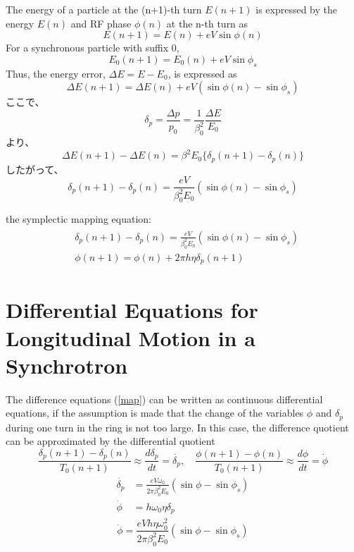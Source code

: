 \documentclass[10pt,a4paper]{ltjsarticle}
\begin{document}
The energy of a particle at the (n+1)-th turn $E(n+1)$ is expressed by the energy $E(n)$ and RF phase $\phi(n)$ at the n-th turn as
%
\begin{equation}
    E(n+1) = E(n) + e V \sin\phi (n)
\end{equation}
%
For a synchronous particle with suffix 0,
%
\begin{equation}
    E_0(n+1) = E_0(n) + e V \sin\phi_s
\end{equation}
%
Thus, the energy error, $\Delta E = E - E_0$, is expressed as
%
\begin{equation}
    \Delta E(n+1) = \Delta E(n) + e V (\sin\phi(n) - \sin\phi_s)
\end{equation}
%
ここで、
%
\begin{equation}
    \delta_p = \frac{\Delta p}{p_0} = \frac{1}{\beta_0^2}\frac{\Delta E}{E_0}
\end{equation}
%
より、
%
\begin{equation}
    \Delta E(n+1) - \Delta E(n) = \beta^2 E_0 \{\delta_p(n+1) - \delta_p(n)\}
\end{equation}
%
したがって、
%
\begin{equation}
    \delta_p(n+1) - \delta_p(n) = \frac{e V}{\beta_0^2 E_0}(\sin\phi(n) -\sin\phi_s)
\end{equation}
%

the symplectic mapping equation:
%
\begin{align}
    \begin{split}
        &\delta_p(n+1) - \delta_p(n) = \frac{e V}{\beta_0^2 E_0}(\sin\phi(n) -\sin\phi_s) \\
        &\phi(n+1) = \phi(n) + 2\pi h \eta \delta_p(n+1)
        \label{map}
    \end{split}
\end{align}
%

\section{Differential Equations for Longitudinal Motion in a Synchrotron}
The difference equations (\ref{map}) can be written as continuous differential equations, if the assumption is made that the change of the variables $\phi$ and $\delta_p$ during one turn in the ring is not too large. In this case, the difference quotient can be approximated by the differential quotient
%
\begin{equation}
    \frac{\delta_p(n+1)-\delta_p(n)}{T_0(n+1)} \approx \frac{d\delta_p}{dt}=\dot{\delta_p},\quad 
    \frac{\phi(n+1)-\phi(n)}{T_0(n+1)} \approx \frac{d\phi}{dt}= \dot{\phi}
\end{equation}
%
\begin{align}
    \begin{split}
        \dot{\delta_p} &= \frac{e V \omega_0}{2\pi \beta_0^2 E_0}(\sin\phi - \sin\phi_s) \\
        \dot{\phi} &= h \omega_0 \eta \delta_p
    \end{split}
\end{align}
%
\begin{equation}
    \ddot{\phi} = \frac{e V h \eta \omega_0^2}{2\pi\beta_0^2 E_0}(\sin\phi-\sin\phi_s)
\end{equation}
%
\end{document}
